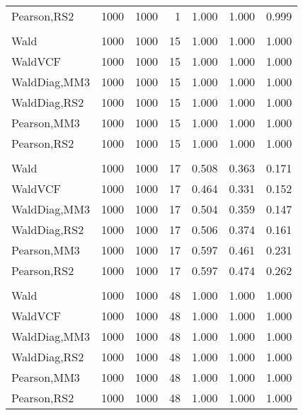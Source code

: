 \documentclass[
]{article}
\begin{document}
\begin{table}[H]
{\begin{tabular}[t]{lrrrrrr}
\hspace{1em}Pearson,RS2 & 1000 & 1000 & 1 & 1.000 & 1.000 & 0.999\\
\addlinespace[0.3em]
\multicolumn{7}{l}{\textbf{1F 15V}}\\
\hspace{1em}Wald & 1000 & 1000 & 15 & 1.000 & 1.000 & 1.000\\
\hspace{1em}WaldVCF & 1000 & 1000 & 15 & 1.000 & 1.000 & 1.000\\
\hspace{1em}WaldDiag,MM3 & 1000 & 1000 & 15 & 1.000 & 1.000 & 1.000\\
\hspace{1em}WaldDiag,RS2 & 1000 & 1000 & 15 & 1.000 & 1.000 & 1.000\\
\hspace{1em}Pearson,MM3 & 1000 & 1000 & 15 & 1.000 & 1.000 & 1.000\\
\hspace{1em}Pearson,RS2 & 1000 & 1000 & 15 & 1.000 & 1.000 & 1.000\\
\addlinespace[0.3em]
\multicolumn{7}{l}{\textbf{2F 10V}}\\
\hspace{1em}Wald & 1000 & 1000 & 17 & 0.508 & 0.363 & 0.171\\
\hspace{1em}WaldVCF & 1000 & 1000 & 17 & 0.464 & 0.331 & 0.152\\
\hspace{1em}WaldDiag,MM3 & 1000 & 1000 & 17 & 0.504 & 0.359 & 0.147\\
\hspace{1em}WaldDiag,RS2 & 1000 & 1000 & 17 & 0.506 & 0.374 & 0.161\\
\hspace{1em}Pearson,MM3 & 1000 & 1000 & 17 & 0.597 & 0.461 & 0.231\\
\hspace{1em}Pearson,RS2 & 1000 & 1000 & 17 & 0.597 & 0.474 & 0.262\\
\addlinespace[0.3em]
\multicolumn{7}{l}{\textbf{3F 15V}}\\
\hspace{1em}Wald & 1000 & 1000 & 48 & 1.000 & 1.000 & 1.000\\
\hspace{1em}WaldVCF & 1000 & 1000 & 48 & 1.000 & 1.000 & 1.000\\
\hspace{1em}WaldDiag,MM3 & 1000 & 1000 & 48 & 1.000 & 1.000 & 1.000\\
\hspace{1em}WaldDiag,RS2 & 1000 & 1000 & 48 & 1.000 & 1.000 & 1.000\\
\hspace{1em}Pearson,MM3 & 1000 & 1000 & 48 & 1.000 & 1.000 & 1.000\\
\hspace{1em}Pearson,RS2 & 1000 & 1000 & 48 & 1.000 & 1.000 & 1.000\\
\bottomrule
\end{tabular}}
\endgroup{}
\end{table}
\end{document}
